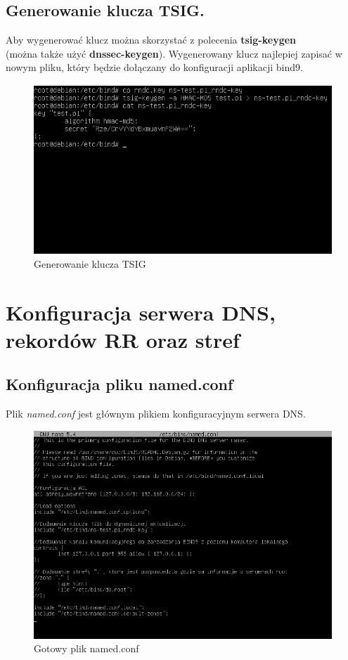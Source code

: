 \documentclass[12pt, a4paper]{article}
\begin{document}
    \subsection{Generowanie klucza TSIG.}
        Aby wygenerować klucz można skorzystać z polecenia \textbf{tsig-keygen} \\(można także użyć \textbf{dnssec-keygen}). 
        Wygenerowany klucz najlepiej zapisać w nowym pliku, który będzie dołączany do konfiguracji aplikacji bind9.
        \begin{figure}[!h]
            \centering
            \includegraphics[width=\textwidth]{klucz_tsig.PNG}
            \caption{Generowanie klucza TSIG}
            \label{fig:TSIG}
        \end{figure}
        
\newpage
\section{Konfiguracja serwera DNS, rekordów RR oraz stref}

    \subsection{Konfiguracja pliku named.conf}
        Plik \textit{named.conf} jest głównym plikiem konfiguracyjnym serwera DNS.
        \begin{figure}[!h]
            \centering
            \includegraphics[width=\textwidth]{named_conf.PNG}
            \caption{Gotowy plik named.conf}
            \label{fig:named}
        \end{figure}
        
\end{document}
